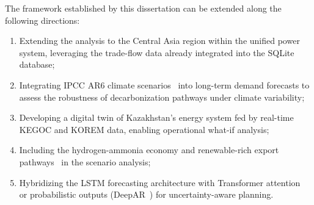 The framework established by this dissertation can be extended along the following directions:
\begin{enumerate}
    \item Extending the analysis to the Central Asia region within the unified power system, leveraging the trade-flow data already integrated into the SQLite database;
    \item Integrating IPCC AR6 climate scenarios~\cite{ipcc2022, rogelj2018} into long-term demand forecasts to assess the robustness of decarbonization pathways under climate variability;
    \item Developing a digital twin of Kazakhstan's energy system fed by real-time KEGOC and KOREM data, enabling operational what-if analysis;
    \item Including the hydrogen-ammonia economy and renewable-rich export pathways~\cite{griffiths2021} in the scenario analysis;
    \item Hybridizing the LSTM forecasting architecture with Transformer attention~\cite{lim2021} or probabilistic outputs (DeepAR~\cite{salinas2020}) for uncertainty-aware planning.
\end{enumerate}
